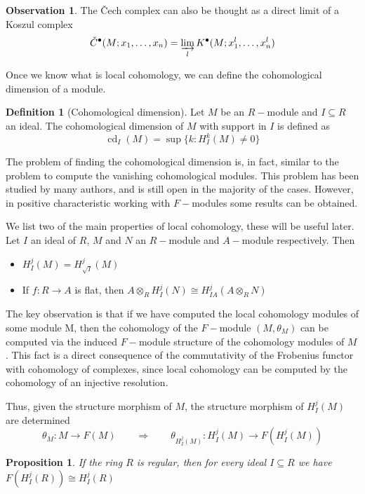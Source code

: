 \documentclass[leqno]{article}
\newtheorem{proposition}{Proposition}[section]
\theoremstyle{definition}
\newtheorem{definition}{Definition}[section]
\newtheorem{observation}{Observation}[section]
\DeclareMathOperator{\cd}{cd}
\begin{document}
\begin{observation}The \v{C}ech complex can also be thought as a direct limit of a Koszul complex
  \[
	\check{C}^{\bullet}(M; x_1, \ldots, x_n) = \varinjlim_{l} K^{\bullet}(M; x_1^l, \ldots, x_n^l)
  \] 
\end{observation}

Once we know what is local cohomology, we can define the cohomological dimension of a module.

\begin{definition}[Cohomological dimension] Let $M$ be an  $R-$module and  $I\subseteq R$ an ideal. The cohomological dimension of $M$ with support in  $I$ is defined as
   \[
	 \cd_I(M)   = \sup \{k : H_I^k(M) \neq 0\}
  \] 
\end{definition}

The problem of finding the cohomological dimension is, in fact, similar to the problem to compute the vanishing cohomological modules. This problem has been studied by many authors, and is still open in the majority of the cases. However, in positive characteristic working with $F-$modules some results can be obtained.

We list two of the main properties of local cohomology, these will be useful later. Let $I$ an ideal of  $R$, $M$ and $N$ an $R-$module and $A-$module respectively. Then
\begin{itemize}[topsep=-6pt, itemsep=0pt]
  \item $H^j_I(M) = H^j_{\sqrt{I} }(M)$ 
  \item If $f:R\to A$ is flat, then $A\otimes _RH^j_I(N) \cong H_{IA}^j(A\otimes_R N)$
\end{itemize}

\vspace{0.5em}

The key observation is that if we have computed the local cohomology modules of some module M, then the cohomology of the $F-$module $(M, \theta_M)$ can be computed via the induced $F-$module structure of the cohomology modules of $M$. This fact is a direct consequence of the commutativity of the Frobenius functor with cohomology of complexes, since local cohomology can be computed by the cohomology of an injective resolution.

Thus, given the structure morphism of $M$, the structure morphism of $H_I^j(M)$ are determined
 \[
\theta_M : M \to F(M)  \qquad \Longrightarrow \qquad
\theta_{H_I^j (M)} : H_{I}^j(M) \to F(H_I^j(M))
\] 

\begin{proposition} If the ring $R$ is regular, then for every ideal $I\subseteq R$ we have $F(H_I^j(R)) \cong  H_{I}^j(R)$
\end{proposition}
\end{document}
